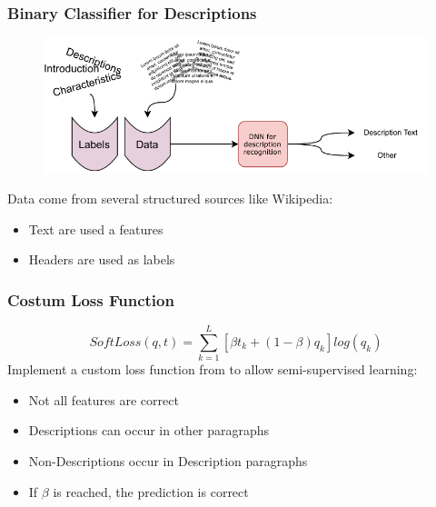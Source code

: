 \documentclass{beamer}
\begin{document}
\begin{frame}
\frametitle{Binary Classifier for Descriptions}
\begin{figure} [htbp]
    \centering
    \includegraphics[width=\textwidth]{figures/midterm_explain_4.pdf}
\end{figure}
Data come from several structured sources like Wikipedia:
\begin{itemize}
    \item Text are used a features
    \item Headers are used as labels
\end{itemize}
\end{frame}


\begin{frame}
\frametitle{Costum Loss Function}
\begin{equation}
 SoftLoss(q, t) = \sum_{k=1}^{L}[\beta t _k + (1- \beta )q _k]log(q _k)
\nonumber\end{equation}
Implement a custom loss function from \textcite{reed_training_2015} to allow semi-supervised learning:
\begin{itemize}
    \item Not all features are correct
    \item Descriptions can occur in other paragraphs
    \item Non-Descriptions occur in Description paragraphs
    \item If \(\beta\) is reached, the prediction is correct
\end{itemize}
\end{frame}
\end{document}
